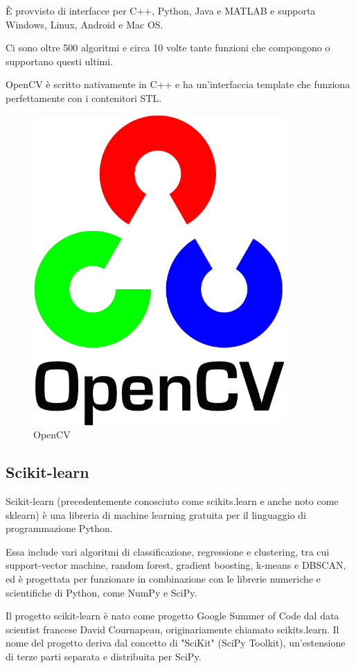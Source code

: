 È provvisto di interfacce per C++, Python, Java e MATLAB e supporta Windows, Linux, Android e Mac OS. 

Ci sono oltre 500 algoritmi e circa 10 volte tante funzioni che compongono o supportano questi ultimi.

OpenCV è scritto nativamente in C++ e ha un'interfaccia template che funziona perfettamente con i contenitori STL.

\begin{figure}
    \begin{center}    
        \includegraphics[width=0.5\linewidth]{images/image8.png}
        \caption{OpenCV}
    \end{center}
\end{figure}

\subsection{Scikit-learn}
Scikit-learn \cite{scikitLearn} (precedentemente conosciuto come scikits.learn e anche noto come sklearn) è una libreria di machine learning gratuita per il linguaggio di programmazione Python. 

Essa include vari algoritmi di classificazione, regressione e clustering, tra cui support-vector machine, random forest, gradient boosting, k-means e DBSCAN, ed è progettata per funzionare in combinazione con le librerie numeriche e scientifiche di Python, come NumPy e SciPy. 

Il progetto scikit-learn è nato come progetto Google Summer of Code dal data scientist francese David Cournapeau, originariamente chiamato scikits.learn. Il nome del progetto deriva dal concetto di "SciKit" (SciPy Toolkit), un'estensione di terze parti separata e distribuita per SciPy. 

